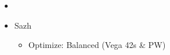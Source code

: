 \begin{multicols}{2}
	\begin{menu}
		\begin{itemize}
			\paradigm
			\begin{itemize}
				\item {}%
				      {\paradigmline{\com}{\rav}{}}%
				      {\paradigmline[2]{\textit{\syn}}{\textit{\sab}}{}}%
				      {\paradigmline{\com}{(\sab)}{}}%
				      {\paradigmline{\rav}{\rav}{}}
			\end{itemize}
			\equip
			\begin{itemize}
				\item Sazh
				      \begin{itemize}
					      \item Optimize: Balanced (Vega 42s \& PW)
				      \end{itemize}
			\end{itemize}
		\end{itemize}
	\end{menu}

	\renewcommand{\first}{[1] Slash \& Burn (\com/\rav)}
	\renewcommand{\second}{[2] Tide Turner (\syn/\sab)}
	\renewcommand{\third}{[3] Divide \& Conquer (\com/\sab)}
	\renewcommand{\fourth}{[4] Dualcasting (\rav/\rav)}


\end{multicols}
